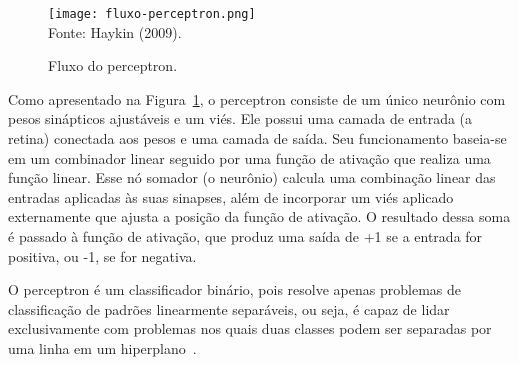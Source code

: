             \begin{figure}[!htb]
                \centering
                \caption{Fluxo do perceptron.}
                \texttt{[image: fluxo-perceptron.png]}\\
                {\footnotesize Fonte: Haykin (2009).}\
                \label{fig:fluxo-perceptron}
            \end{figure}

            Como apresentado na Figura~\ref{fig:fluxo-perceptron}, o perceptron consiste de um único neurônio com 
            pesos sinápticos ajustáveis e um viés. Ele possui uma camada de entrada (a retina) conectada aos pesos e 
            uma camada de saída. Seu funcionamento baseia-se em um combinador linear seguido por uma função de 
            ativação que realiza uma função linear. Esse nó somador (o neurônio) calcula uma combinação linear das 
            entradas aplicadas às suas sinapses, além de incorporar um viés aplicado externamente que ajusta a posição
            da função de ativação. O resultado dessa soma é passado à função de ativação, que produz uma saída de +1 
            se a entrada for positiva, ou -1, se for negativa. 
            
            O perceptron é um classificador binário, pois resolve apenas problemas de classificação de padrões 
            linearmente separáveis, ou seja, é capaz de lidar exclusivamente com problemas nos quais duas classes 
            podem ser separadas por uma linha em um hiperplano~\cite{haykin2009neural}. 



            
